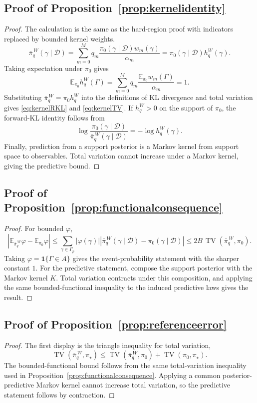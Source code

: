 \documentclass[twoside,11pt]{article}
\newcommand{\D}{\mathcal{D}}
\newcommand{\E}{\mathbb{E}}
\newcommand{\ind}{\mathbf{1}}
\newcommand{\TV}{\operatorname{TV}}
\begin{document}
\subsection{Proof of Proposition~\ref{prop:kernelidentity}}

\begin{proof} The calculation is the same as the hard-region proof with indicators replaced by bounded kernel weights.
\[
\bar\pi_q^{\,W}(\gamma\mid\D) = \sum_{m=0}^M q_m \frac{\pi_0(\gamma\mid\D)w_m(\gamma)}{\alpha_m} = \pi_0(\gamma\mid\D)h_q^W(\gamma).
\]
Taking expectation under $\pi_0$ gives
\[
\E_{\pi_0}h_q^W(\Gamma) = \sum_{m=0}^M q_m \frac{\E_{\pi_0}w_m(\Gamma)}{\alpha_m} =1.
\]
Substituting $\bar\pi_q^{\,W}=\pi_0h_q^W$ into the definitions of KL divergence and total variation gives \eqref{eq:kernelRKL} and \eqref{eq:kernelTV}. If $h_q^W>0$ on the support of $\pi_0$, the forward-KL identity follows from
\[
\log\frac{\pi_0(\gamma\mid\D)} {\bar\pi_q^{\,W}(\gamma\mid\D)} = -\log h_q^W(\gamma).
\]
Finally, prediction from a support posterior is a Markov kernel from support space to observables. Total variation cannot increase under a Markov kernel, giving the predictive bound.
\end{proof}

\subsection{Proof of Proposition~\ref{prop:functionalconsequence}}

\begin{proof} For bounded \(\varphi\),
\[
\left| \E_{\bar\pi_q^{\,W}}\varphi-\E_{\pi_0}\varphi \right| \le \sum_{\gamma\in\Gamma_p}|\varphi(\gamma)| \left|\bar\pi_q^{\,W}(\gamma\mid\D)-\pi_0(\gamma\mid\D)\right| \le 2B\,\TV(\bar\pi_q^{\,W},\pi_0).
\]
Taking \(\varphi=\ind\{\Gamma\in A\}\) gives the event-probability statement with the sharper constant \(1\). For the predictive statement, compose the support posterior with the Markov kernel \(K\). Total variation contracts under this composition, and applying the same bounded-functional inequality to the induced predictive laws gives the result.
\end{proof}

\subsection{Proof of Proposition~\ref{prop:referenceerror}}

\begin{proof} The first display is the triangle inequality for total variation,
\[
\TV(\bar\pi_q^{\,W},\pi_\star) \le \TV(\bar\pi_q^{\,W},\pi_0)+\TV(\pi_0,\pi_\star).
\]
The bounded-functional bound follows from the same total-variation inequality used in Proposition~\ref{prop:functionalconsequence}. Applying a common posterior-predictive Markov kernel cannot increase total variation, so the predictive statement follows by contraction.
\end{proof}
\end{document}

